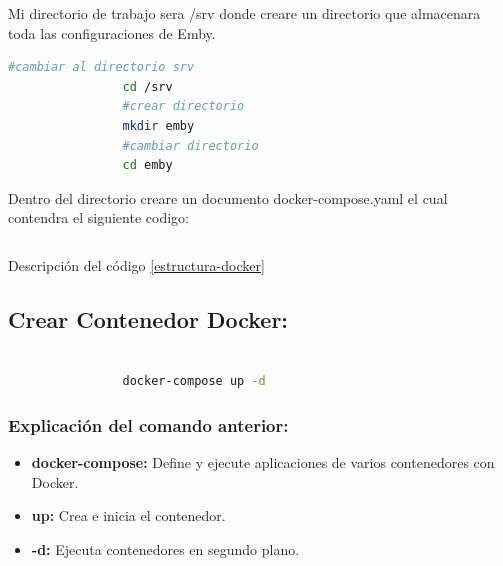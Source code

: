 			Mi directorio de trabajo sera /srv donde creare un directorio que almacenara toda las configuraciones de Emby.\par
			
			\begin{lstlisting}[language=Bash,caption=Directorio de trabajo Emby]
				#cambiar al directorio srv
				cd /srv
				#crear directorio
				mkdir emby
				#cambiar directorio
				cd emby
			\end{lstlisting}
			
			\clearpage
			
			Dentro del directorio creare un documento docker-compose.yaml el cual contendra el siguiente codigo:
								
			\inputminted{yaml}{documentos/docker/emby/docker-compose.yml}
			
			\begin{tcolorbox}[enhanced,attach boxed title to top center={yshift=-3mm,yshifttext=-1mm},
			colback=blue!5!white,colframe=blue!75!black,colbacktitle=red!80!black,title= Estructura del documento,fonttitle=\bfseries, boxed title style={size=small,colframe=red!50!black} ]
			
			\centering
			
				Descripción del código \ref{estructura-docker}
			
			\end{tcolorbox}
			
			\subsection{Crear Contenedor Docker:}\par\vspace{0.2cm}
			
			\begin{lstlisting}[language=bash,caption=Crear contenedor Docker]
	
				docker-compose up -d
			\end{lstlisting}	
			
			\subsubsection{Explicación del comando anterior:}\par
			
			\begin{itemize}
				
				\item \textbf{docker-compose:} Define y ejecute aplicaciones de varios contenedores con Docker.
				
				\item \textbf{up:} Crea e inicia el contenedor.
				
				\item \textbf{-d:} Ejecuta contenedores en segundo plano.
				
			\end{itemize}
			
